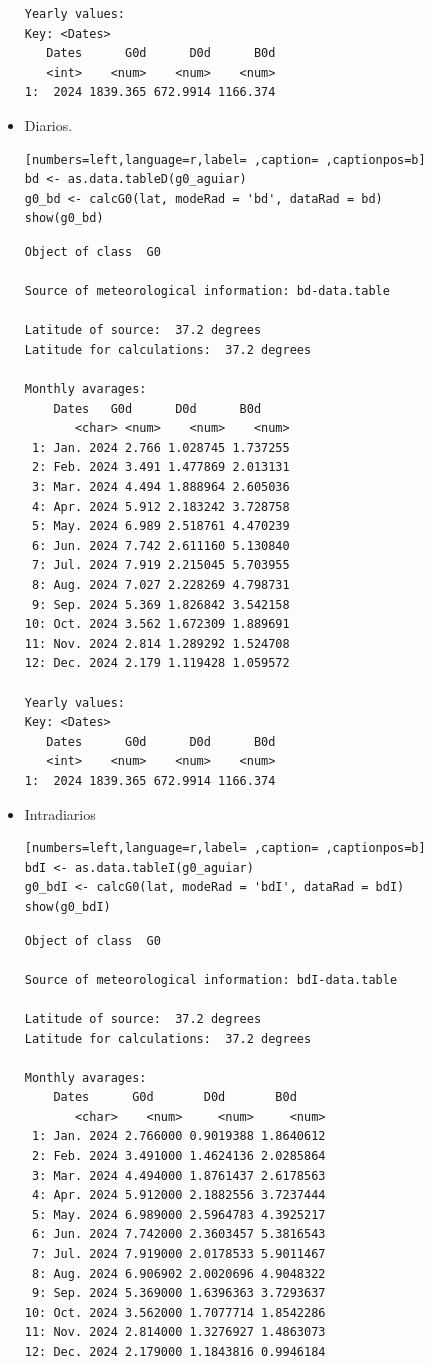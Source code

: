 \begin{itemize}
\begin{verbatim}
Yearly values:
Key: <Dates>
   Dates      G0d      D0d      B0d
   <int>    <num>    <num>    <num>
1:  2024 1839.365 672.9914 1166.374
\end{verbatim}

\item Diarios.
\begin{lstlisting}[numbers=left,language=r,label= ,caption= ,captionpos=b]
bd <- as.data.tableD(g0_aguiar)
g0_bd <- calcG0(lat, modeRad = 'bd', dataRad = bd)
show(g0_bd)
\end{lstlisting}

\begin{verbatim}
Object of class  G0 

Source of meteorological information: bd-data.table 

Latitude of source:  37.2 degrees
Latitude for calculations:  37.2 degrees

Monthly avarages:
	Dates   G0d      D0d      B0d
       <char> <num>    <num>    <num>
 1: Jan. 2024 2.766 1.028745 1.737255
 2: Feb. 2024 3.491 1.477869 2.013131
 3: Mar. 2024 4.494 1.888964 2.605036
 4: Apr. 2024 5.912 2.183242 3.728758
 5: May. 2024 6.989 2.518761 4.470239
 6: Jun. 2024 7.742 2.611160 5.130840
 7: Jul. 2024 7.919 2.215045 5.703955
 8: Aug. 2024 7.027 2.228269 4.798731
 9: Sep. 2024 5.369 1.826842 3.542158
10: Oct. 2024 3.562 1.672309 1.889691
11: Nov. 2024 2.814 1.289292 1.524708
12: Dec. 2024 2.179 1.119428 1.059572

Yearly values:
Key: <Dates>
   Dates      G0d      D0d      B0d
   <int>    <num>    <num>    <num>
1:  2024 1839.365 672.9914 1166.374
\end{verbatim}

\item Intradiarios
\begin{lstlisting}[numbers=left,language=r,label= ,caption= ,captionpos=b]
bdI <- as.data.tableI(g0_aguiar)
g0_bdI <- calcG0(lat, modeRad = 'bdI', dataRad = bdI)
show(g0_bdI)
\end{lstlisting}

\begin{verbatim}
Object of class  G0 

Source of meteorological information: bdI-data.table 

Latitude of source:  37.2 degrees
Latitude for calculations:  37.2 degrees

Monthly avarages:
	Dates      G0d       D0d       B0d
       <char>    <num>     <num>     <num>
 1: Jan. 2024 2.766000 0.9019388 1.8640612
 2: Feb. 2024 3.491000 1.4624136 2.0285864
 3: Mar. 2024 4.494000 1.8761437 2.6178563
 4: Apr. 2024 5.912000 2.1882556 3.7237444
 5: May. 2024 6.989000 2.5964783 4.3925217
 6: Jun. 2024 7.742000 2.3603457 5.3816543
 7: Jul. 2024 7.919000 2.0178533 5.9011467
 8: Aug. 2024 6.906902 2.0020696 4.9048322
 9: Sep. 2024 5.369000 1.6396363 3.7293637
10: Oct. 2024 3.562000 1.7077714 1.8542286
11: Nov. 2024 2.814000 1.3276927 1.4863073
12: Dec. 2024 2.179000 1.1843816 0.9946184


\end{verbatim}
\end{itemize}
